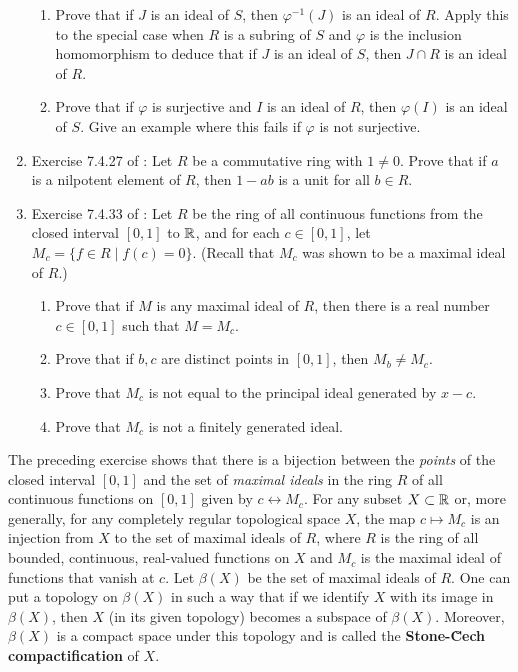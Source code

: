 \documentclass[../psets.tex]{subfiles}
\begin{document}
\begin{enumerate}
    \begin{enumerate}[label={\textbf{(\alph*)}}]
        \item Prove that if $J$ is an ideal of $S$, then $\varphi^{-1}(J)$ is an ideal of $R$. Apply this to the special case when $R$ is a subring of $S$ and $\varphi$ is the inclusion homomorphism to deduce that if $J$ is an ideal of $S$, then $J\cap R$ is an ideal of $R$.
        \item Prove that if $\varphi$ is surjective and $I$ is an ideal of $R$, then $\varphi(I)$ is an ideal of $S$. Give an example where this fails if $\varphi$ is not surjective.
    \end{enumerate}
    \item Exercise 7.4.27 of \textcite{bib:DummitFoote}: Let $R$ be a commutative ring with $1\neq 0$. Prove that if $a$ is a nilpotent element of $R$, then $1-ab$ is a unit for all $b\in R$.
    \item Exercise 7.4.33 of \textcite{bib:DummitFoote}: Let $R$ be the ring of all continuous functions from the closed interval $[0,1]$ to $\mathbb{R}$, and for each $c\in[0,1]$, let $M_c=\{f\in R\mid f(c)=0\}$. (Recall that $M_c$ was shown to be a maximal ideal of $R$.)
    \begin{enumerate}[label={\textbf{(\alph*)}}]
        \item Prove that if $M$ is any maximal ideal of $R$, then there is a real number $c\in[0,1]$ such that $M=M_c$.
        \item Prove that if $b,c$ are distinct points in $[0,1]$, then $M_b\neq M_c$.
        \item Prove that $M_c$ is not equal to the principal ideal generated by $x-c$.
        \item Prove that $M_c$ is not a finitely generated ideal.
    \end{enumerate}
\end{enumerate}
The preceding exercise shows that there is a bijection between the \emph{points} of the closed interval $[0,1]$ and the set of \emph{maximal ideals} in the ring $R$ of all continuous functions on $[0,1]$ given by $c\leftrightarrow M_c$. For any subset $X\subset\mathbb{R}$ or, more generally, for any completely regular topological space $X$, the map $c\mapsto M_c$ is an injection from $X$ to the set of maximal ideals of $R$, where $R$ is the ring of all bounded, continuous, real-valued functions on $X$ and $M_c$ is the maximal ideal of functions that vanish at $c$. Let $\beta(X)$ be the set of maximal ideals of $R$. One can put a topology on $\beta(X)$ in such a way that if we identify $X$ with its image in $\beta(X)$, then $X$ (in its given topology) becomes a subspace of $\beta(X)$. Moreover, $\beta(X)$ is a compact space under this topology and is called the \textbf{Stone-\u{C}ech compactification} of $X$.
\end{document}
